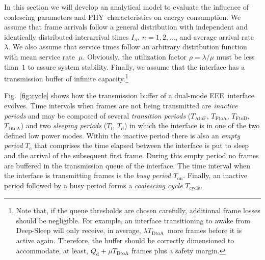 \documentclass[journal,10pt,letterpaper]{IEEEtran}
\begin{document}
In this section we will develop an analytical model to evaluate the
influence of coalescing parameters and PHY~characteristics on energy
consumption. We assume that frame arrivals follow a general
distribution with independent and identically distributed interarrival
times $I_n$, $n=1,2,\ldots$, and average arrival rate~$\lambda$. We
also assume that service times follow an arbitrary distribution
function with mean service rate~$\mu$. Obviously, the utilization
factor $\rho=\lambda/\mu$ must be less than~$1$ to assure system
stability. Finally, we assume that the interface has a transmission
buffer of infinite capacity.\footnote{Note that, if the queue
  thresholds are chosen carefully, additional frame losses should be
  negligible. For example, an interface transitioning to awake from
  Deep-Sleep will only receive, in average, $\lambda
  T_{\mathrm{DtoA}}$~more frames before it is active again. Therefore,
  the buffer should be correctly dimensioned to accommodate, at least,
  $Q_{\mathrm{d}} + \mu T_{\mathrm{DtoA}}$ frames plus a safety
  margin.}

Fig.~\ref{fig:cycle} shows how the transmission buffer of a dual-mode
EEE~interface evolves. Time intervals when frames are not being
transmitted are \emph{inactive periods} and may be composed of several
\emph{transition periods} ($T_{\mathrm{AtoF}}$, $T_{\mathrm{FtoA}}$,
$T_{\mathrm{FtoD}}$, $T_{\mathrm{DtoA}}$) and two \emph{sleeping
  periods} ($T_{\mathrm{f}}$, $T_{\mathrm{d}}$) in which the interface
is in one of the two defined low power modes. Within the inactive
period there is also an \emph{empty period} $T_{\mathrm{e}}$ that
comprises the time elapsed between the interface is put to sleep and
the arrival of the subsequent first frame. During this empty period no
frames are buffered in the transmission queue of the interface. The
time interval when the interface is transmitting frames is the
\emph{busy period} $T_{\mathrm{on}}$. Finally, an inactive period
followed by a busy period forms a \emph{coalescing cycle}
$T_{\mathrm{cycle}}$. 
\end{document}
